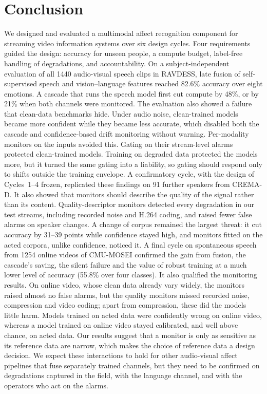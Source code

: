 \section{Conclusion}\label{sec:conclusion}

We designed and evaluated a multimodal affect recognition component for streaming video information systems over six design cycles. Four requirements guided the design: accuracy for unseen people, a compute budget, label-free handling of degradations, and accountability. On a subject-independent evaluation of all 1440 audio-visual speech clips in RAVDESS, late fusion of self-supervised speech and vision--language features reached 82.6\% accuracy over eight emotions. A cascade that runs the speech model first cut compute by 48\%, or by 21\% when both channels were monitored. The evaluation also showed a failure that clean-data benchmarks hide. Under audio noise, clean-trained models became more confident while they became less accurate, which disabled both the cascade and confidence-based drift monitoring without warning. Per-modality monitors on the inputs avoided this. Gating on their stream-level alarms protected clean-trained models. Training on degraded data protected the models more, but it turned the same gating into a liability, so gating should respond only to shifts outside the training envelope. A confirmatory cycle, with the design of Cycles~1--4 frozen, replicated these findings on 91 further speakers from CREMA-D. It also showed that monitors should describe the quality of the signal rather than its content. Quality-descriptor monitors detected every degradation in our test streams, including recorded noise and H.264 coding, and raised fewer false alarms on speaker changes. A change of corpus remained the largest threat: it cut accuracy by 31--39 points while confidence stayed high, and monitors fitted on the acted corpora, unlike confidence, noticed it. A final cycle on spontaneous speech from 1254 online videos of CMU-MOSEI confirmed the gain from fusion, the cascade's saving, the silent failure and the value of robust training at a much lower level of accuracy (55.8\% over four classes). It also qualified the monitoring results. On online video, whose clean data already vary widely, the monitors raised almost no false alarms, but the quality monitors missed recorded noise, compression and video coding; apart from compression, these did the models little harm. Models trained on acted data were confidently wrong on online video, whereas a model trained on online video stayed calibrated, and well above chance, on acted data. Our results suggest that a monitor is only as sensitive as its reference data are narrow, which makes the choice of reference data a design decision. We expect these interactions to hold for other audio-visual affect pipelines that fuse separately trained channels, but they need to be confirmed on degradations captured in the field, with the language channel, and with the operators who act on the alarms.
